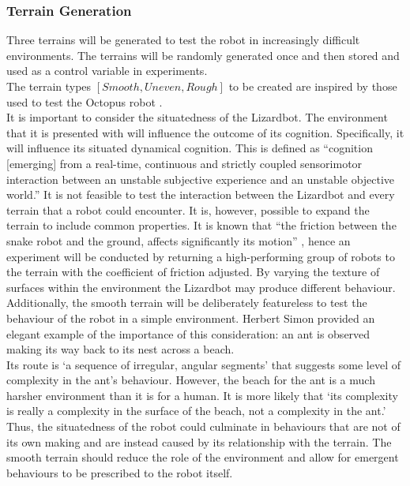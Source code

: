 \documentclass{article}
\begin{document}
\subsubsection{Terrain Generation}
Three terrains will be generated to test the robot in increasingly difficult environments. The terrains will be randomly generated once and then stored and used as a control variable in experiments.\\ 
The terrain types $[Smooth, Uneven, Rough]$ to be created are inspired by those used to test the Octopus robot .\\

It is important to consider the situatedness of the Lizardbot. The environment that it is presented with will influence the outcome of its cognition. Specifically, it will influence its situated dynamical cognition. This is defined as “cognition [emerging] from a real-time, continuous and strictly coupled sensorimotor interaction between an unstable subjective experience and an unstable objective world.” 
It is not feasible to test the interaction between the Lizardbot and every terrain that a robot could encounter. It is, however, possible to expand the terrain to include common properties. It is known that “the friction between the snake robot and the ground, affects significantly its motion” , hence an experiment will be conducted by returning a high-performing group of robots to the terrain with the coefficient of friction adjusted. By varying the texture of surfaces within the environment the Lizardbot may produce different behaviour. \\

Additionally, the smooth terrain will be deliberately featureless to test the behaviour of the robot in a simple environment. Herbert Simon provided an elegant example of the importance of this consideration: an ant is observed making its way back to its nest across a beach.\\
Its route is ‘a sequence of irregular, angular segments’ that suggests some level of complexity in the ant's behaviour. However, the beach for the ant is a much harsher environment than it is for a human. It is more likely that ‘its complexity is really a complexity in the surface of the beach, not a complexity in the ant.’  Thus, the situatedness of the robot could culminate in behaviours that are not of its own making and are instead caused by its relationship with the terrain. The smooth terrain should reduce the role of the environment and allow for emergent behaviours to be prescribed to the robot itself.\\
\end{document}

